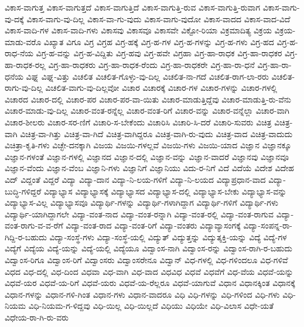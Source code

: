 {ವಿಕಾಸ-ವಾಗುತ್ತ
ವಿಕಾಸ-ವಾಗುತ್ತದೆ
ವಿಕಾಸ-ವಾಗುತ್ತಿದೆ
ವಿಕಾಸ-ವಾಗುತ್ತಿ-ರುವ
ವಿಕಾಸ-ವಾಗುತ್ತಿ-ರುವಾಗ
ವಿಕಾಸ-ವಾಗು-ವು-ದಕ್ಕೆ
ವಿಕಾಸ-ವಾಗು-ವು-ದಿಲ್ಲ
ವಿಕಾಸ-ವಾ-ಗು-ವುದು
ವಿಕಾಸ-ವಾಗು-ವುದೋ
ವಿಕಾಸ-ವಾದದ
ವಿಕಾಸ-ವಾದ-ವಿದೆ
ವಿಕಾಸ-ವಾದಿ-ಗಳ
ವಿಕಾಸ-ವಾದಿ-ಗಳು
ವಿಕಾಸವು
ವಿಕಾಸವೂ
ವಿಕಾಸವೇ
ವಿಕ್ಟೋ-ರಿಯಾ
ವಿಕ್ರಮಾದಿತ್ಯ
ವಿಕ್ರಯ
ವಿಕ್ರಯ-ಮಾಡು-ವರೊ
ವಿಖ್ಯಾತ
ವಿಗೂ
ವಿಗ್ರ
ವಿಗ್ರಹ
ವಿಗ್ರ-ಹಕ್ಕೆ
ವಿಗ್ರ-ಹ-ಗಳ
ವಿಗ್ರ-ಹ-ಗಳನ್ನು
ವಿಗ್ರ-ಹ-ಗಳು
ವಿಗ್ರ-ಹದ
ವಿಗ್ರ-ಹ-ರಾಧ-ನೆಯ
ವಿಗ್ರ-ಹ-ವನ್ನು
ವಿಗ್ರ-ಹ-ವಿದ್ದಿತು
ವಿಗ್ರ-ಹವು
ವಿಗ್ರ-ಹವೇ
ವಿಗ್ರಹಾ
ವಿಗ್ರ-ಹಾ-ರಾಧಕ
ವಿಗ್ರ-ಹಾ-ರಾಧಕರ
ವಿಗ್ರ-ಹಾ-ರಾಧಕ-ರಲ್ಲ
ವಿಗ್ರ-ಹಾ-ರಾಧಕರು
ವಿಗ್ರ-ಹಾ-ರಾಧಕ-ರೆಂದು
ವಿಗ್ರ-ಹಾ-ರಾಧಕರೇ
ವಿಗ್ರ-ಹಾ-ರಾ-ಧನೆ
ವಿಗ್ರ-ಹಾ-ರಾ-ಧನೆಯ
ವಿಘ್ನ
ವಿಘ್ನ-ವಿತ್ತು
ವಿಚಲಿತ
ವಿಚಲಿತ-ಗೊಳ್ಳು-ವು-ದಿಲ್ಲ
ವಿಚಲಿತ-ನಾ-ಗದೆ
ವಿಚಲಿತ-ರಾಗ-ಲಾ-ರರು
ವಿಚಲಿತ-ರಾಗು-ವು-ದಿಲ್ಲ
ವಿಚಲಿತ-ವಾಗು-ವು-ದಿಲ್ಲವೋ
ವಿಚಾರ
ವಿಚಾರಕ್ಕೆ
ವಿಚಾರ-ಗಳ
ವಿಚಾರ-ಗಳನ್ನು
ವಿಚಾರ-ಗಳಲ್ಲಿ
ವಿಚಾರದ
ವಿಚಾರ-ದಲ್ಲಿ
ವಿಚಾರ-ಪರ
ವಿಚಾರ-ಪರ-ವಾ-ಯಿತು
ವಿಚಾರ-ಮಾಡುತ್ತಿದ್ದೆವು
ವಿಚಾರ-ಮಾಡುತ್ತಿ-ರು-ವೆನು
ವಿಚಾರ-ಮಾಡು-ವು-ದಿಲ್ಲ
ವಿಚಾರ-ವಂತ-ರನ್ನೆಲ್ಲ
ವಿಚಾರ-ವಂತ-ರಿಗೆ
ವಿಚಾರ-ವನ್ನು
ವಿಚಾರ-ವನ್ನೆಲ್ಲಾ
ವಿಚಾರ-ವಾಗಿ
ವಿಚಾರ-ಶೀಲರು
ವಿಚಾರ-ಸರ-ಣಿಗೆ
ವಿಚಾರಿ-ಸ-ಬೇಕೆಂದು
ವಿಚಾರಿಸಿ
ವಿಚಾರಿ-ಸಿ-ದರೆ
ವಿಚಾರಿ-ಸುವರು
ವಿಚಿತ್ರ
ವಿಚಿತ್ರ-ವಾಗಿ
ವಿಚಿತ್ರ-ವಾ-ಗಿತ್ತು
ವಿಚಿತ್ರ-ವಾ-ಗಿದೆ
ವಿಚಿತ್ರ-ವಾಗಿದ್ದರೂ
ವಿಚಿತ್ರ-ವಾಗಿ-ರು-ವುದು
ವಿಚಿತ್ರ-ವಾದ
ವಿಚಿತ್ರ-ವಾದುದು
ವಿಚಿತ್ರಾ-ಕೃತಿ-ಗಳು
ವಿಚ್ಛೇ-ದನಕ್ಕಾಗಿ
ವಿಜಯ
ವಿಜಯಿ-ಗಳಲ್ಲವೆ
ವಿಜಯಿ-ಗಳು
ವಿಜಯಿ-ಯಾದ
ವಿಜ್ಞಾನ
ವಿಜ್ಞಾನಕ್ಕೂ
ವಿಜ್ಞಾನ-ಗಳಂತೆ
ವಿಜ್ಞಾನ-ಗಳಲ್ಲಿ
ವಿಜ್ಞಾನದ
ವಿಜ್ಞಾನ-ದಲ್ಲಿ
ವಿಜ್ಞಾನ-ವನ್ನು
ವಿಜ್ಞಾನ-ವಾದರೆ
ವಿಜ್ಞಾನವು
ವಿಜ್ಞಾನವೂ
ವಿಜ್ಞಾನ-ವೆಂದು
ವಿಜ್ಞಾನ-ವೆಂಬ
ವಿಜ್ಞಾನಿ-ಗಳು
ವಿಜ್ಞಾನಿಗೆ
ವಿಜ್ಞಾನಿಯು
ವಿದು-ರ-ನಿಗೆ
ವಿದೆ
ವಿದೆಯೆ
ವಿದೇಶ
ವಿದೇಹ
ವಿದ್
ವಿದ್ದಂತೆ
ವಿದ್ದರೆ
ವಿದ್ಯಾ
ವಿದ್ಯಾ-ದಾನ
ವಿದ್ಯಾ-ನಿ-ಲಯ-ಗಳಿಗೆ
ವಿದ್ಯಾ-ನಿ-ಲಯದ
ವಿದ್ಯಾಪ್ರಧಾನ-ವಾದ
ವಿದ್ಯಾ-ಬುದ್ಧಿ-ಗಳಿದ್ದರೆ
ವಿದ್ಯಾಭ್ಯಾಸ
ವಿದ್ಯಾಭ್ಯಾಸಕ್ಕೆ
ವಿದ್ಯಾಭ್ಯಾಸದ
ವಿದ್ಯಾಭ್ಯಾಸ-ದಲ್ಲಿ
ವಿದ್ಯಾಭ್ಯಾಸ-ಬೇಕು
ವಿದ್ಯಾಭ್ಯಾಸ-ವನ್ನು
ವಿದ್ಯಾಭ್ಯಾಸ-ವಿಲ್ಲ
ವಿದ್ಯಾಭ್ಯಾಸವೂ
ವಿದ್ಯಾರ್ಥಿ-ಗಳನ್ನು
ವಿದ್ಯಾರ್ಥಿ-ಗಳಾಗಿದ್ದಾಗ
ವಿದ್ಯಾರ್ಥಿ-ಗಳಿಗೆ
ವಿದ್ಯಾರ್ಥಿ-ಗಳು
ವಿದ್ಯಾರ್ಥಿ-ಯಾಗಿದ್ದಾಗಲೇ
ವಿದ್ಯಾ-ವಂತ-ನಾದ
ವಿದ್ಯಾ-ವಂತ-ರನ್ನಾಗಿ
ವಿದ್ಯಾ-ವಂತ-ರಲ್ಲಿ
ವಿದ್ಯಾ-ವಂತ-ರಾಗುವ
ವಿದ್ಯಾ-ವಂತ-ರಾಗು-ವ-ವ-ರೆಗೆ
ವಿದ್ಯಾ-ವಂತ-ರಾದ
ವಿದ್ಯಾ-ವಂತ-ರಿಗೆ
ವಿದ್ಯಾ-ವಂತರು
ವಿದ್ಯಾವ್ಯಾಸಂಗಕ್ಕೆ
ವಿದ್ಯಾ-ಸಂಪನ್ನ-ರಾ-ಗಿದ್ದಿ-ರ-ಬಹುದು
ವಿದ್ಯಾ-ಸಂಸ್ಥೆ-ಗಳು
ವಿದ್ಯಾ-ಸಂಸ್ಥೆ-ಯಲ್ಲಿ
ವಿದ್ಯುತ್
ವಿದ್ಯುತ್ತನ್ನು
ವಿದ್ಯುತ್ಶಕ್ತಿ-ಯನ್ನು
ವಿದ್ಯೆ
ವಿದ್ಯೆ-ಗಳ
ವಿದ್ಯೆಗೆ
ವಿದ್ಯೆಯ
ವಿದ್ಯೆ-ಯನ್ನು
ವಿದ್ಯೆ-ಯಲ್ಲಿ
ವಿದ್ಯೆಯೂ
ವಿದ್ವಾಂಸ-ನಾಗಿ
ವಿದ್ವಾಂಸ-ರನ್ನು
ವಿದ್ವಾಂಸ-ರಾಗಿ-ರ-ಬಹುದು
ವಿದ್ವಾಂಸ-ರಿಗೂ
ವಿದ್ವಾಂಸ-ರಿಗೆ
ವಿದ್ವಾಂಸರು
ವಿದ್ವಾಂಸರೇನೂ
ವಿದ್ವಾನ್
ವಿಧ-ಗಳಲ್ಲಿ
ವಿಧ-ಗಳಿಂದಲೂ
ವಿಧ-ಗಳಿವೆ
ವಿಧದ
ವಿಧ-ದಲ್ಲಿ
ವಿಧ-ದಿಂದ
ವಿಧವಾ
ವಿಧ-ವಾಗಿ
ವಿಧ-ವಾದ
ವಿಧವಿಧ
ವಿಧವೆ
ವಿಧವೆಗೆ
ವಿಧ-ವೆಯ
ವಿಧವೆ-ಯನ್ನು
ವಿಧವೆ-ಯರ
ವಿಧವೆ-ಯ-ರಿಗೆ
ವಿಧವೆ-ಯರು
ವಿಧವೆ-ಯ-ರೆಲ್ಲರೂ
ವಿಧವೆ-ಯಾಗುವೆ
ವಿಧಾನ
ವಿಧಾನಕ್ಕಿಂತ
ವಿಧಾನಕ್ಕೆ
ವಿಧಾನ-ಗಳನ್ನು
ವಿಧಾನ-ಗಳಿ-ಗಿಂತ
ವಿಧಾನ-ಗಳು
ವಿಧಾನ-ವಾದರೂ
ವಿಧಿ
ವಿಧಿ-ಗಳನ್ನು
ವಿಧಿ-ಗಳಿಂದ
ವಿಧಿ-ಗಳು
ವಿಧಿ-ನಿಯಮ
ವಿಧಿ-ನಿಯಮ-ಗ-ಳಿದ್ದವು
ವಿಧಿ-ಯಿಲ್ಲ
ವಿಧಿ-ಯಿಲ್ಲದೆ
ವಿಧಿಯು
ವಿಧಿಯೇ
ವಿಧಿ-ವಿಲಾಸ
ವಿಧೇ-ಯತೆ
ವಿಧೇಯ-ರಾ-ಗಿ-ರು-ವರು
}
